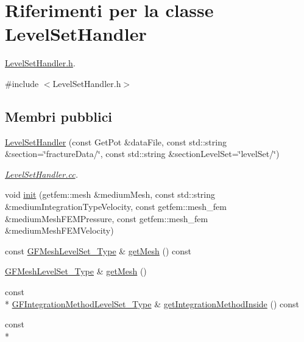 \hypertarget{classLevelSetHandler}{\section{Riferimenti per la classe Level\-Set\-Handler}
\label{classLevelSetHandler}
}


\hyperlink{LevelSetHandler_8h}{Level\-Set\-Handler.\-h}.  




{\ttfamily \#include $<$Level\-Set\-Handler.\-h$>$}

\subsection*{Membri pubblici}
\begin{DoxyCompactItemize}
\item 
\hyperlink{classLevelSetHandler_a9dbe142d7d4f677abe8c204714c004ed}{Level\-Set\-Handler} (const Get\-Pot \&data\-File, const std\-::string \&section=\char`\"{}fracture\-Data/\char`\"{}, const std\-::string \&section\-Level\-Set=\char`\"{}level\-Set/\char`\"{})
\begin{DoxyCompactList}\small\item\em \hyperlink{LevelSetHandler_8cc}{Level\-Set\-Handler.\-cc}. \end{DoxyCompactList}\item 
void \hyperlink{classLevelSetHandler_a7ee7ade813923dfdef1bc25e9a881580}{init} (getfem\-::mesh \&medium\-Mesh, const std\-::string \&medium\-Integration\-Type\-Velocity, const getfem\-::mesh\-\_\-fem \&medium\-Mesh\-F\-E\-M\-Pressure, const getfem\-::mesh\-\_\-fem \&medium\-Mesh\-F\-E\-M\-Velocity)
\item 
const \hyperlink{Core_8h_a126f7165f04db4ed0b72454469145a08}{G\-F\-Mesh\-Level\-Set\-\_\-\-Type} \& \hyperlink{classLevelSetHandler_a6e08147a60f9e8d7ec65357223f72311}{get\-Mesh} () const 
\item 
\hyperlink{Core_8h_a126f7165f04db4ed0b72454469145a08}{G\-F\-Mesh\-Level\-Set\-\_\-\-Type} \& \hyperlink{classLevelSetHandler_a35e4adb6d0c5128445d46f0b489ce0a2}{get\-Mesh} ()
\item 
const \\*
\hyperlink{Core_8h_ade18ba6e17965b6fdd50b3382b2a7020}{G\-F\-Integration\-Method\-Level\-Set\-\_\-\-Type} \& \hyperlink{classLevelSetHandler_a1bf7aa9bad7c2ccec178d4092690775b}{get\-Integration\-Method\-Inside} () const 
\item 
const \\*

\end{DoxyCompactItemize}
